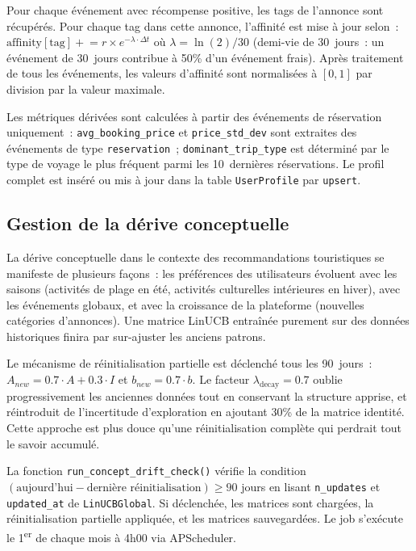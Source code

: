 Pour chaque événement avec récompense positive, les tags de l'annonce sont récupérés.
Pour chaque tag dans cette annonce, l'affinité est mise à jour selon~:
$\text{affinity}[\text{tag}] \mathrel{+}= r \times e^{-\lambda \cdot \Delta t}$ où
$\lambda = \ln(2)/30$ (demi-vie de 30~jours~: un événement de 30~jours contribue à 50\%
d'un événement frais). Après traitement de tous les événements, les valeurs d'affinité sont
normalisées à $[0, 1]$ par division par la valeur maximale.

Les métriques dérivées sont calculées à partir des événements de réservation uniquement~:
\texttt{avg\_booking\_price} et \texttt{price\_std\_dev} sont extraites des événements de
type \texttt{reservation}~; \texttt{dominant\_trip\_type} est déterminé par le type de voyage
le plus fréquent parmi les 10~dernières réservations. Le profil complet est inséré ou mis à
jour dans la table \texttt{UserProfile} par \texttt{upsert}.


\subsection{Gestion de la dérive conceptuelle}

La dérive conceptuelle dans le contexte des recommandations touristiques se manifeste de
plusieurs façons~: les préférences des utilisateurs évoluent avec les saisons (activités
de plage en été, activités culturelles intérieures en hiver), avec les événements globaux,
et avec la croissance de la plateforme (nouvelles catégories d'annonces). Une matrice LinUCB
entraînée purement sur des données historiques finira par sur-ajuster les anciens patrons.

Le mécanisme de réinitialisation partielle est déclenché tous les 90~jours~:
$A_{new} = 0.7 \cdot A + 0.3 \cdot I$ et $b_{new} = 0.7 \cdot b$. Le facteur
$\lambda_{\text{decay}} = 0.7$ oublie progressivement les anciennes données tout en
conservant la structure apprise, et réintroduit de l'incertitude d'exploration en ajoutant
30\% de la matrice identité. Cette approche est plus douce qu'une réinitialisation complète
qui perdrait tout le savoir accumulé.

La fonction \texttt{run\_concept\_drift\_check()} vérifie la condition
$(\text{aujourd'hui} - \text{dernière réinitialisation}) \geq 90$ jours en lisant
\texttt{n\_updates} et \texttt{updated\_at} de \texttt{LinUCBGlobal}. Si déclenchée, les
matrices sont chargées, la réinitialisation partielle appliquée, et les matrices sauvegardées.
Le job s'exécute le 1\textsuperscript{er} de chaque mois à 4h00 via APScheduler.


